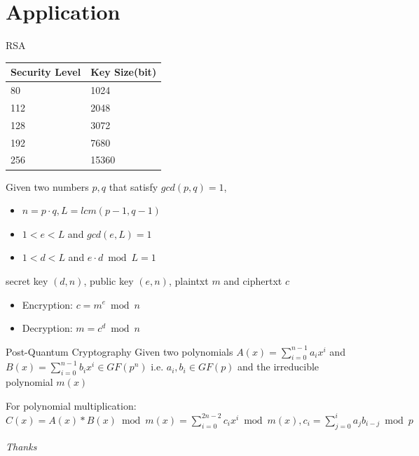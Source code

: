 \documentclass{beamer}
\begin{document}
\section{Application}
\begin{frame}{RSA}
	\begin{table}[]
		\begin{tabular}{|l|l|}
			\hline
			Security Level & Key Size(bit) \\ \hline
			80             & 1024          \\ \hline
			112            & 2048          \\ \hline
			128            & 3072          \\ \hline
			192            & 7680          \\ \hline
			256            & 15360         \\ \hline
		\end{tabular}
	\end{table}
	Given two numbers $p, q$ that satisfy $gcd(p, q) = 1$,
	\begin{itemize}
		\item $n = p\cdot q, L = lcm(p-1, q-1)$
		\item $1 < e < L$ and $gcd(e, L) = 1$
		\item $1 < d < L$ and $e \cdot d \bmod L = 1$
	\end{itemize}
	secret key $(d,n)$, public key $(e,n)$, plaintxt $m$ and ciphertxt $c$

	\begin{itemize}
		\item Encryption: $c = m^e \bmod n$
		\item Decryption: $m = c^d \bmod n$
	\end{itemize}
\end{frame}

\begin{frame}{Post-Quantum Cryptography}
	Given two polynomials $A(x) = \sum_{i=0}^{n-1} a_ix^i$ and $B(x) = \sum_{i=0}^{n-1} b_ix^i \in GF(p^n)$ i.e. $a_i, b_i \in GF(p)$ and the irreducible polynomial $m(x)$

	For \alert{polynomial multiplication}:
	$C(x) = A(x) * B(x) \bmod m(x)= \sum_{i=0}^{2n-2}c_i x^i \bmod m(x), c_i = \sum_{j=0}^{i} a_j b_{i-j} \bmod p$
\end{frame}

\begin{frame}{}
	\centering \Large
	\emph{Thanks}
\end{frame}
\end{document}
